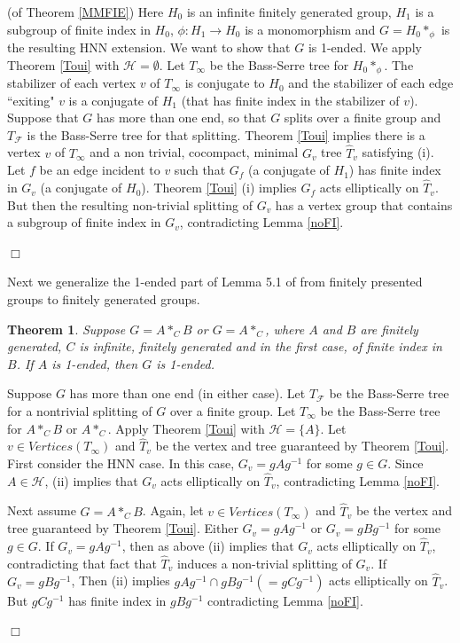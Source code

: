 \documentclass[12pt]{article}
\newtheorem{theorem}{Theorem}[subsection]
\newenvironment{proof}{\addvspace{12pt}\noindent{\bf Proof:}}{
$\Box$\par\addvspace{12pt}}
\begin{document}
\begin{proof} (of Theorem \ref{MMFIE}) Here $H_0$ is an infinite finitely generated group, $H_1$ is a subgroup of finite index in $H_0$, $\phi:H_1\to H_0$ is a monomorphism and $G=H_0\ast_\phi$ is the resulting HNN extension. We want to show that $G$ is 1-ended. 
We apply Theorem \ref{Toui} with $\mathcal H=\emptyset$. Let $T_\infty$ be the Bass-Serre tree for $H_0\ast_\phi$. The stabilizer of each vertex $v$ of $T_\infty$ is conjugate to $H_0$ and the stabilizer of each edge ``exiting" $v$ is a conjugate of $H_1$ (that has finite index in the stabilizer of $v$). Suppose that $G$ has more than one end, so that $G$ splits over a finite group and $T_\mathcal F$ is the Bass-Serre tree for that splitting. Theorem \ref{Toui} implies there is a vertex $v$ of $T_\infty$ and a non trivial, cocompact, minimal $G_v$ tree $\hat T_v$ satisfying (i). Let $f$ be an edge incident to $v$ such that $G_f$ (a conjugate of $H_1$) has finite index in $G_v$ (a conjugate of $H_0$).
Theorem \ref{Toui} (i) implies $G_f$ acts elliptically on $\hat T_v$. But then the resulting non-trivial splitting of $G_v$ has a vertex group that contains a subgroup of finite index in $G_v$, contradicting Lemma \ref{noFI}.
\end{proof}

Next we generalize the 1-ended part of Lemma 5.1 of \cite{Mih22} from finitely presented groups to finitely generated groups.

\begin{theorem} \label{SS3} 
Suppose $G=A\ast_CB$ or $G=A\ast_C$, where $A$ and $B$ are finitely generated, $C$ is infinite, finitely generated  and in the first case, of finite index in $B$. If $A$ is 1-ended, then $G$ is 1-ended.
\end{theorem}
\begin{proof}
Suppose $G$ has more than one end (in either case). Let $T_{\mathcal F}$ be the Bass-Serre tree for a nontrivial splitting of $G$ over a finite group. Let $T_\infty$ be the Bass-Serre tree for $A\ast_CB$ or $A\ast_C$.
Apply Theorem \ref{Toui} with $\mathcal H=\{A\}$. Let $v\in Vertices(T_\infty)$ and $\hat T_v$ be the vertex and tree guaranteed by Theorem \ref{Toui}. First consider the HNN case. In this case, $G_v=gAg^{-1}$ for some $g\in G$.
Since $A\in \mathcal H$,  (ii) implies that $G_v$ acts elliptically on $\hat T_v$, contradicting Lemma \ref{noFI}. 

Next assume $G=A\ast_CB$. Again,  let $v\in Vertices(T_\infty)$ and $\hat T_v$ be the vertex and tree guaranteed by Theorem \ref{Toui}. Either $G_v=gAg^{-1}$ or $G_v=gBg^{-1}$ for some $g\in G$. If $G_v=gAg^{-1}$, then as above (ii) implies  that $G_v$ acts elliptically on $\hat T_v$, contradicting that fact that $\hat T_v$ induces a non-trivial splitting of $G_v$. If $G_v=gBg^{-1}$, Then (ii) implies $gAg^{-1}\cap gBg^{-1} (=gCg^{-1})$ acts elliptically on $\hat T_v$. But $gCg^{-1}$ has finite index in $gBg^{-1}$ contradicting Lemma \ref{noFI}. 
\end{proof}
\end{document}
